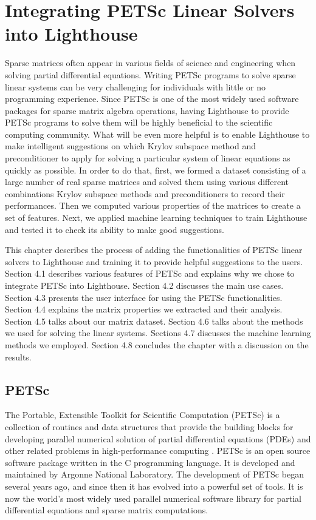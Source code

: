 \chapter{Integrating PETSc Linear Solvers into Lighthouse}
\label{addingpetscchap}

Sparse matrices often appear in various fields of science and engineering when solving partial differential equations. Writing PETSc programs to solve sparse linear systems can be very challenging for individuals with little or no programming experience. Since PETSc is one of the most widely used software packages for sparse matrix algebra operations, having Lighthouse to provide PETSc programs to solve them will be highly beneficial to the scientific computing community. What will be even more helpful is to enable Lighthouse to make intelligent suggestions on which Krylov subspace method and preconditioner to apply for solving a particular system of linear equations as quickly as possible. In order to do that, first, we formed a dataset consisting of a large number of real sparse matrices and solved them using various different combinations Krylov subspace methods and preconditioners to record their performances. Then we computed various properties of the matrices to create a set of features. Next, we applied machine learning techniques to train Lighthouse and tested it to check its ability to make good suggestions.

This chapter describes the process of adding the functionalities of PETSc linear solvers to Lighthouse and training it to provide helpful suggestions to the users. Section 4.1 describes various features of PETSc and explains why we chose to integrate PETSc into Lighthouse. Section 4.2 discusses the main use cases. Section 4.3 presents the user interface for using the PETSc functionalities. Section 4.4 explains the matrix properties we extracted and their analysis. Section 4.5 talks about our matrix dataset. Section 4.6 talks about the methods we used for solving the linear systems.  Sections 4.7 discusses the machine learning methods we employed. Section 4.8 concludes the chapter with a discussion on the results.

\section{PETSc}

The Portable, Extensible Toolkit for Scientific Computation (PETSc) is a collection of routines and data structures that provide the building blocks for developing parallel numerical solution of partial differential equations (PDEs) and other related problems in high-performance computing  \cite{petscman}. PETSc is an open source software package written in the C programming language. It is  developed and maintained by Argonne National Laboratory. The development of PETSc began several years ago, and since then it has evolved into a powerful set of tools. It is now the world's most widely used parallel numerical software library for partial differential equations and sparse matrix computations.

